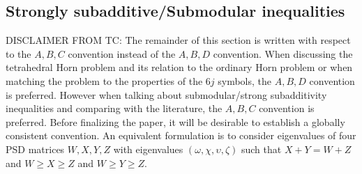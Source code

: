 \documentclass[notitlepage, 10pt]{article}
\begin{document}
\subsection{Strongly subadditive/Submodular inequalities}

{\color{blue}
DISCLAIMER FROM TC: 
The remainder of this section is written with respect to the $A,B,C$ convention instead of the $A,B,D$ convention. 
When discussing the tetrahedral Horn problem and its relation to the ordinary Horn problem or when matching the problem to the properties of the $6j$ symbols, the $A,B,D$ convention is preferred. 
However when talking about submodular/strong subadditivity inequalities and comparing with the literature, the $A,B,C$ convention is preferred. 
Before finalizing the paper, it will be desirable to establish a globally consistent convention.
An equivalent formulation is to consider eigenvalues of four PSD matrices $W,X,Y,Z$ with eigenvalues $(\omega, \chi, \upsilon, \zeta)$ such that $X+Y=W+Z$ and $W \geq X \geq Z$ and $W \geq Y \geq Z$.
}
\end{document}
